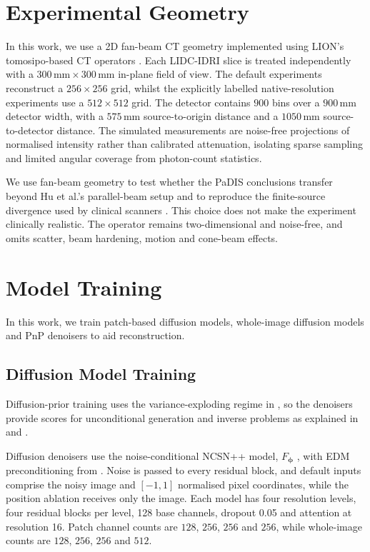 \section{Experimental Geometry}
In this work, we use a 2D fan-beam CT geometry implemented using LION's tomosipo-based CT operators \cite{}. Each LIDC-IDRI slice is treated independently with a $300\,\mathrm{mm}\times300\,\mathrm{mm}$ in-plane field of view. The default experiments reconstruct a $256\times 256$ grid, whilst the explicitly labelled native-resolution experiments use a $512\times 512$ grid. The detector contains $900$ bins over a $900\, \mathrm{mm}$ detector width, with a $575\,\mathrm{mm}$ source-to-origin distance and a $1050\,\mathrm{mm}$ source-to-detector distance. The simulated measurements are noise-free projections of normalised intensity rather than calibrated attenuation, isolating sparse sampling and limited angular coverage from photon-count statistics.

We use fan-beam geometry to test whether the PaDIS conclusions transfer beyond Hu et al.'s parallel-beam setup and to reproduce the finite-source divergence used by clinical scanners \cite{}. This choice does not make the experiment clinically realistic. The operator remains two-dimensional and noise-free, and omits scatter, beam hardening, motion and cone-beam effects.

\section{Model Training}
\label{sec:methods-model-training}

In this work, we train patch-based diffusion models, whole-image diffusion models and PnP denoisers to aid reconstruction.

\subsection{Diffusion Model Training}
Diffusion-prior training uses the variance-exploding regime in , so the denoisers provide scores for unconditional generation and inverse problems as explained in  and .

Diffusion denoisers use the noise-conditional NCSN++ model, $F_{\boldsymbol{\phi}}$ \cite{song...}, with EDM preconditioning from . Noise is passed to every residual block, and default inputs comprise the noisy image and $[-1,1]$ normalised pixel coordinates, while the position ablation receives only the image. Each model has four resolution levels, four residual blocks per level, 128 base channels, dropout 0.05 and attention at resolution 16. Patch channel counts are $128$, $256$, $256$ and $256$, while whole-image counts are $128$, $256$, $256$ and $512$.

